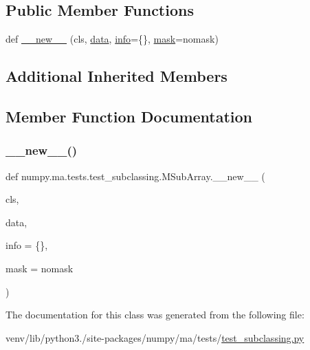 \subsection*{Public Member Functions}
\begin{DoxyCompactItemize}
\item 
def \hyperlink{classnumpy_1_1ma_1_1tests_1_1test__subclassing_1_1MSubArray_a048be1c938c47b3aa69367efa813ca15}{\+\_\+\+\_\+new\+\_\+\+\_\+} (cls, \hyperlink{classnumpy_1_1ma_1_1core_1_1MaskedArray_a2d6c6c9dbd568a0ea5140111887cf652}{data}, \hyperlink{classnumpy_1_1ma_1_1tests_1_1test__subclassing_1_1SubArray_a0cae3b0c17520834cb96be34f0295e09}{info}=\{\}, \hyperlink{classnumpy_1_1ma_1_1core_1_1MaskedArray_a7ef4d822649ddda22965ba79c54e0afc}{mask}=nomask)
\end{DoxyCompactItemize}
\subsection*{Additional Inherited Members}


\subsection{Member Function Documentation}
\mbox{\label{classnumpy_1_1ma_1_1tests_1_1test__subclassing_1_1MSubArray_a048be1c938c47b3aa69367efa813ca15}} 
\subsubsection{\texorpdfstring{\+\_\+\+\_\+new\+\_\+\+\_\+()}{\_\_new\_\_()}}
{\footnotesize\ttfamily def numpy.\+ma.\+tests.\+test\+\_\+subclassing.\+M\+Sub\+Array.\+\_\+\+\_\+new\+\_\+\+\_\+ (\begin{DoxyParamCaption}\item[{}]{cls,  }\item[{}]{data,  }\item[{}]{info = {\ttfamily \{\}},  }\item[{}]{mask = {\ttfamily nomask} }\end{DoxyParamCaption})}



The documentation for this class was generated from the following file\+:\begin{DoxyCompactItemize}
\item 
venv/lib/python3./site-\/packages/numpy/ma/tests/\hyperlink{test__subclassing_8py}{test\+\_\+subclassing.\+py}\end{DoxyCompactItemize}
